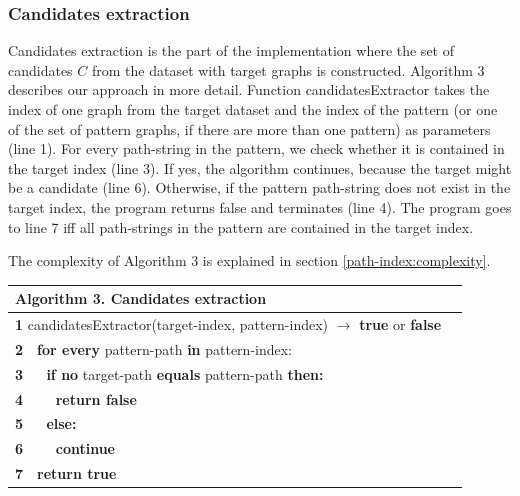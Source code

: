 \documentclass{l4proj}
\begin{document}
\subsubsection{Candidates extraction}
\label{path-index:candidates-extraction}
Candidates extraction is the part of the implementation where the set of candidates $C$ from the dataset with target graphs is constructed. Algorithm 3 describes our approach in more detail. Function \textrm{candidatesExtractor} takes the index of one graph from the target dataset and the index of the pattern (or one of the set of pattern graphs, if there are more than one pattern) as parameters (line 1). For every path-string in the pattern, we check whether it is contained in the target index (line 3). If yes, the algorithm continues, because the target might be a candidate (line 6). Otherwise, if the pattern path-string does not exist in the target index, the program returns false and terminates (line 4). The program goes to line 7 iff all path-strings in the pattern are contained in the target index.\par
The complexity of Algorithm 3 is explained in section \ref{path-index:complexity}. 
\begin{table}[H]
 \centering
 \label{Algorithm 3.}
 \begin{tabular}{l l}
 \textbf{Algorithm 3.} Candidates extraction \\\hline
 \small\textbf{1} \small{candidatesExtractor(target-index, pattern-index) $\rightarrow$ \textbf{true} or \textbf{false}}\\
 \small\textbf{2} \,\,\,\,\small{\textbf{for every} pattern-path \textbf{in} pattern-index:}\\
 \small\textbf{3} \,\,\,\,\,\,\,\,\small{\textbf{if no} target-path \textbf{equals} pattern-path \textbf{then:}}\\
 \small\textbf{4} \,\,\,\,\,\,\,\,\,\,\,\,\small{\textbf{return false}}\\
 \small\textbf{5} \,\,\,\,\,\,\,\,\small{\textbf{else:}}\\
 \small\textbf{6} \,\,\,\,\,\,\,\,\,\,\,\,\small{\textbf{continue}}\\
 \small\textbf{7} \,\,\,\,\small{\textbf{return true}}\\
 \hline
 \end{tabular}
\end{table}
\end{document}
